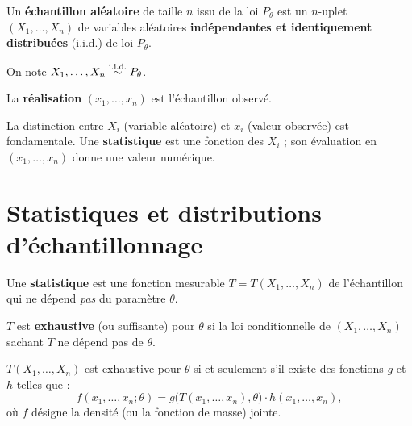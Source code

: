 \begin{definition}
Un \textbf{\'echantillon al\'eatoire} de taille $n$ issu de la loi $P_\theta$ est un $n$-uplet $(X_1,\ldots,X_n)$ de variables al\'eatoires \textbf{ind\'ependantes et identiquement distribu\'ees} (i.i.d.) de loi $P_\theta$.

On note $X_1,\ldots,X_n \overset{\text{i.i.d.}}{\sim} P_\theta$.

La \textbf{r\'ealisation} $(x_1,\ldots,x_n)$ est l'\'echantillon observ\'e.
\end{definition}

\begin{remarque}
La distinction entre $X_i$ (variable al\'eatoire) et $x_i$ (valeur observ\'ee) est fondamentale. Une \textbf{statistique} est une fonction des $X_i$ ; son \'evaluation en $(x_1,\ldots,x_n)$ donne une valeur num\'erique.
\end{remarque}

\section{Statistiques et distributions d'\'echantillonnage}

\begin{definition}[Statistique]
Une \textbf{statistique} est une fonction mesurable $T=T(X_1,\ldots,X_n)$ de l'\'echantillon qui ne d\'epend \emph{pas} du param\`etre $\theta$.
\end{definition}

\begin{definition}
$T$ est \textbf{exhaustive} (ou suffisante) pour $\theta$ si la loi conditionnelle de $(X_1,\ldots,X_n)$ sachant $T$ ne d\'epend pas de $\theta$.
\end{definition}

\begin{theoreme}
\label{thm:fisher-neyman}
$T(X_1,\ldots,X_n)$ est exhaustive pour $\theta$ si et seulement s'il existe des fonctions $g$ et $h$ telles que :
\[
f(x_1,\ldots,x_n;\theta) = g\bigl(T(x_1,\ldots,x_n),\theta\bigr)\cdot h(x_1,\ldots,x_n),
\]
o\`u $f$ d\'esigne la densit\'e (ou la fonction de masse) jointe.
\end{theoreme}

